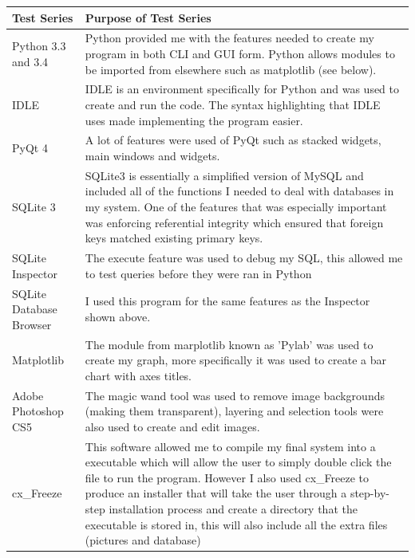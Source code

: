 \begin{center}
    \begin{tabular}{|p{4cm}|p{6cm}|}
        \hline
        \textbf{Test Series} & \textbf{Purpose of Test Series} \\ \hline
        Python 3.3 and 3.4 & Python provided me with the features needed to create my program in both CLI and GUI form. Python allows modules to be imported from elsewhere such as matplotlib (see below).  \\ \hline
        IDLE & IDLE is an environment specifically for Python and was used to create and run the code. The syntax highlighting that IDLE uses made implementing the program easier. \\ \hline
        PyQt 4 & A lot of features were used of PyQt such as stacked widgets, main windows and widgets. \\ \hline
        SQLite 3 & SQLite3 is essentially a simplified version of MySQL and included all of the functions I needed to deal with databases in my system. One of the features that was especially important was enforcing referential integrity which ensured that foreign keys matched existing primary keys.  \\ \hline
        SQLite Inspector & The execute feature was used to debug my SQL, this allowed me to test queries before they were ran in Python  \\ \hline
        SQLite Database Browser & I used this program for the same features as the Inspector shown above.   \\ \hline
        Matplotlib & The module from marplotlib known as 'Pylab' was used to create my graph, more specifically it was used to create a bar chart with axes titles.  \\ \hline
        Adobe Photoshop CS5 & The magic wand tool was used to remove image backgrounds (making them transparent), layering and selection tools were also used to create and edit images. \\ \hline
        cx\_Freeze & This software allowed me to compile my final system into a executable which will allow the user to simply double click the file to run the program. However I also used cx\_Freeze to produce an installer that will take the user through a step-by-step installation process and create a directory that the executable is stored in, this will also include all the extra files (pictures and database) \\ \hline
    \end{tabular}
\end{center}

